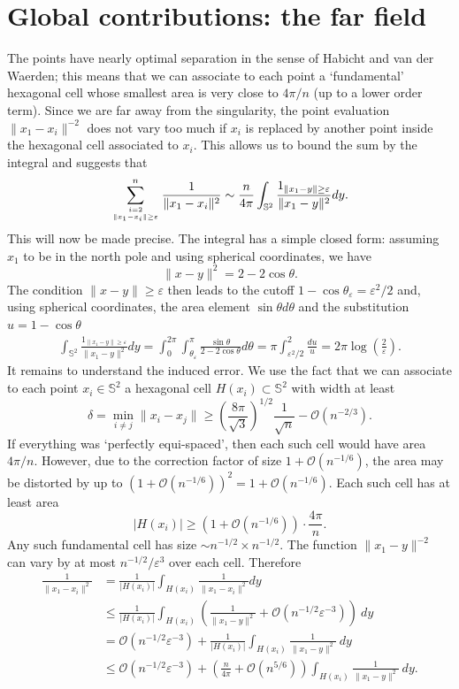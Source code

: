 \documentclass[10pt, reqno]{amsart}
\begin{document}
\section{Global contributions: the far field} 
The points have nearly optimal separation in the sense of Habicht and van der Waerden; this means that we can associate to each point a `fundamental' hexagonal cell whose smallest area is very close to $4\pi/n$ (up to a lower order term). Since we are far away from the singularity, the point evaluation $\|x_1 - x_i\|^{-2}$ does not vary too much if $x_i$ is replaced by another point inside the hexagonal cell associated to $x_i$. This allows us to bound the sum by the integral and suggests that
$$  \sum_{i=2 \atop \|x_1 - x_i\| \geq \varepsilon}^{n} \frac{1}{\|x_1 - x_i\|^2} \sim  \frac{n}{4\pi} \int_{\mathbb{S}^2} \frac{1_{\|x_1-y\| \geq \varepsilon}}{\|x_1-y\|^2} dy.$$
This will now be made precise. The integral has a simple closed form: assuming $x_1$ to be in the north pole and using spherical coordinates, we have
$$ \| x- y\|^2 = 2 - 2 \cos{\theta}.$$
The condition $\|x - y\| \geq \varepsilon$ then leads to the cutoff $1- \cos{\theta_{\varepsilon}} = \varepsilon^2/2$ and, using spherical coordinates, the
area element $\sin{\theta} d\theta$ and the substitution $u = 1 - \cos{\theta}$
\begin{align*}
 \int_{\mathbb{S}^2} \frac{1_{\|x_1-y\| \geq \varepsilon}}{\|x_1-y\|^2} dy  = \int_0^{2\pi} \int_{\theta_{\varepsilon}}^{\pi} \frac{\sin{\theta}}{2 - 2 \cos{\theta}} d\theta = \pi \int_{\varepsilon^2/2}^{2} \frac{du}{u} = 2 \pi \log\left(\frac{2}{\varepsilon} \right).
\end{align*}
It remains to understand the induced error. 
We use the fact that we can associate to each point $x_i \in \mathbb{S}^2$ a hexagonal cell $H(x_i) \subset \mathbb{S}^2$ with width at least
$$ \delta =  \min_{i \neq j} \|x_i - x_j\| \geq   \left( \frac{8 \pi}{\sqrt{3}} \right)^{1/2} \frac{1}{\sqrt{n}} - \mathcal{O}(n^{-2/3}).$$
If everything was `perfectly equi-spaced', then each such cell would have area $4 \pi /n$. However, due to the correction factor of size $1 + \mathcal{O}(n^{-1/6})$,
the area may be distorted by up to $(1 + \mathcal{O}(n^{-1/6}))^2 = 1 + \mathcal{O}(n^{-1/6})$. Each such cell has at least area 
$$ |H(x_i)| \geq (1 + \mathcal{O}(n^{-1/6})) \cdot \frac{4 \pi}{n}.$$
Any such fundamental cell has size $\sim n^{-1/2} \times n^{-1/2}$. The function $\|x_1-y\|^{-2}$ can vary by at most $n^{-1/2}/\varepsilon^3$ over each cell. Therefore
\begin{align*}
\frac{1}{\|x_1- x_i\|^2}  &= \frac{1}{|H(x_i)|} \int_{H(x_i)}  \frac{1}{\|x_1- x_i\|^2} dy \\
&\leq  \frac{1}{|H(x_i)|} \int_{H(x_i)}  \left( \frac{1}{\|x_1- y\|^2} + \mathcal{O}(n^{-1/2} \varepsilon^{-3})\right) ~dy\\
&=  \mathcal{O}(n^{-1/2} \varepsilon^{-3})  + \frac{1}{|H(x_i)|} \int_{H(x_i)}  \frac{1}{\|x_1- y\|^2} ~dy\\
&\leq  \mathcal{O}(n^{-1/2} \varepsilon^{-3})  + \left(\frac{n}{4\pi} + \mathcal{O}(n^{5/6}) \right) \int_{H(x_i)}  \frac{1}{\|x_1- y\|^2} ~dy.
\end{align*}
\end{document}
